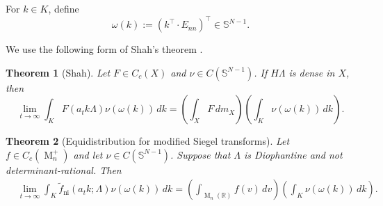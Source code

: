\documentclass[reqno,11pt]{amsart}
\numberwithin{equation}{section}
\newtheorem{theorem}{Theorem}[section]
\theoremstyle{definition}
\theoremstyle{remark}
\newcommand{\op}{\operatorname}
\newcommand{\R}{\mathbb R}
\newcommand{\M}{\op{M}}
\begin{document}
For $k\in K$, define
$$
\omega(k):=(k^{\intercal}\!\cdot E_{nn})^{\intercal}
\in\mathbb S^{N-1}.
$$

We use the following form of Shah's theorem
\cite[Corollary~1.2]{shah}.

\begin{theorem}[Shah]
\label{thm:Ratnerequidistributionbounded}
Let $F\in C_c(X)$ and $\nu\in C(\mathbb S^{N-1})$. If
$H\Lambda$ is dense in $X$, then
$$
\lim_{t\to\infty}
\int_KF(a_tk\Lambda)\nu(\omega(k))\,dk
=
\left(\int_XF\,dm_X\right)
\left(\int_K\nu(\omega(k))\,dk\right).
$$
\end{theorem}

\begin{theorem}[Equidistribution for modified Siegel transforms]
\label{thm:Ratnerequidistributionunbounded}
Let $f\in C_c(\M_n^+)$ and let
$\nu\in C(\mathbb S^{N-1})$. Suppose that $\Lambda$ is Diophantine and
not determinant-rational. Then
\begin{align}\label{eq:modified-Siegel-equidistribution}
&\lim_{t\to\infty}
\int_K
\widetilde f_{\operatorname{ni}}(a_tk;\Lambda)
\nu(\omega(k))\,dk=
\left(\int_{\M_n(\R)}f(v)\,dv\right)
\left(\int_K\nu(\omega(k))\,dk\right).
\end{align}
\end{theorem}
\end{document}
